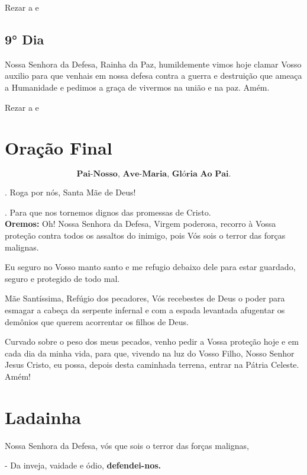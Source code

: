 \documentclass[a4paper,14pt]{extarticle} \usepackage[utf8]{inputenc}
\makeatletter
\newcommand{\vers@resp@sym}{%
  \raisebox{0.2ex}{\rotatebox[origin=c]{-20}{$\m@th\rceil$}}%
}
\newcommand{\vers@resp}[2]{%
  {\ooalign{%
     \hidewidth\kern#1\vers@resp@sym\hidewidth\cr
     #2\cr
  }}%
}
\DeclareRobustCommand{\versicle}{\vers@resp{-0.1em}{V}}
\DeclareRobustCommand{\response}{\vers@resp{0pt}{R}}
\makeatother
\begin{document}
Rezar a \textbf{} e \textbf{}


\subsection{9° Dia}

Nossa Senhora da Defesa, Rainha da Paz, humildemente vimos hoje clamar Vosso auxilio para que venhais em nossa defesa contra a guerra e destruição que ameaça a Humanidade e pedimos a graça de vivermos na união e na paz. Amém.

Rezar a \textbf{} e \textbf{}




\section{Oração Final} \label{oracao-final}
\[
  \textbf{Pai-Nosso, Ave-Maria, Glória Ao Pai.}
\]

\response. \quad Roga por nós, Santa Mãe de Deus!

\versicle. \quad Para que nos tornemos dignos das promessas de Cristo. \\

\textbf{Oremos:} Oh! Nossa Senhora da Defesa, Virgem poderosa, recorro à Vossa proteção contra todos os assaltos do inimigo, pois Vós sois o terror das forças malignas.  

Eu seguro no Vosso manto santo e me refugio debaixo dele para estar guardado, seguro e protegido de todo mal.  

Mãe Santíssima, Refúgio dos pecadores, Vós recebestes de Deus o poder para esmagar a cabeça da serpente infernal e com a espada levantada afugentar os demônios que querem acorrentar os filhos de Deus.  

Curvado sobre o peso dos meus pecados, venho pedir a Vossa proteção hoje e em cada dia da minha vida, para que, vivendo na luz do Vosso Filho, Nosso Senhor Jesus Cristo, eu possa, depois desta caminhada terrena, entrar na Pátria Celeste. Amém!  


\section{Ladainha} \label{ladainha}

Nossa Senhora da Defesa, vós que sois o terror das forças malignas, 

- Da inveja, vaidade e ódio, \textbf{defendei-nos.}
\end{document}
